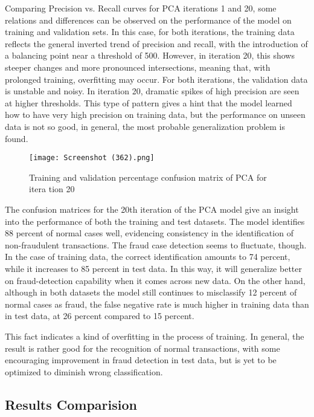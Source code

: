 \documentclass[journal]{IEEEtran}
\begin{document}
Comparing Precision vs. Recall curves for PCA iterations 1 and 20, some relations and differences can be observed on the performance of the model on training and validation sets. In this case, for both iterations, the training data reflects the general inverted trend of precision and recall, with the introduction of a balancing point near a threshold of 500. However, in iteration 20, this shows steeper changes and more pronounced intersections, meaning that, with prolonged training, overfitting may occur. For both iterations, the validation data is unstable and noisy. In iteration 20, dramatic spikes of high precision are seen at higher thresholds. This type of pattern gives a hint that the model learned how to have very high precision on training data, but the performance on unseen data is not so good, in general, the most probable generalization problem is found.


\begin{figure}[h!] %
    \centering
    \texttt{[image: Screenshot (362).png]}  %
        \caption{Training and validation percentage confusion matrix of PCA for itera
tion 20}
    \label{fig:cm}
\end{figure}

The confusion matrices for the 20th iteration of the PCA model give an insight into the performance of both the training and test datasets. The model identifies 88 percent of normal cases well, evidencing consistency in the identification of non-fraudulent transactions. The fraud case detection seems to fluctuate, though. In the case of training data, the correct identification amounts to 74 percent, while it increases to 85 percent in test data. In this way, it will generalize better on fraud-detection capability when it comes across new data. On the other hand, although in both datasets the model still continues to misclassify 12 percent of normal cases as fraud, the false negative rate is much higher in training data than in test data, at 26 percent compared to 15 percent. 

This fact indicates a kind of overfitting in the process of training. In general, the result is rather good for the recognition of normal transactions, with some encouraging improvement in fraud detection in test data, but is yet to be optimized to diminish wrong classification.

\subsection{Results Comparision}
\end{document}
